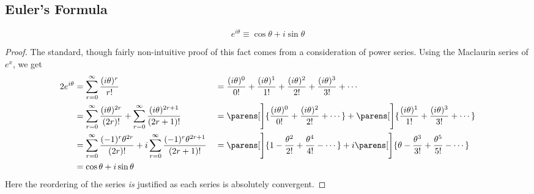 \subsection{Euler's Formula}

\begin{theorem}
 \begin{equation*}
  e^{i\theta} \equiv \cos \theta + i \sin \theta
 \end{equation*}
\end{theorem}
\begin{proof}
 The standard, though fairly non-intuitive proof of this fact comes from a
 consideration of power series. Using the Maclaurin series of \(e^x\), we get
 \begin{alignat*}2
  e^{i\theta} &= \sum_{r = 0}^\infty \frac{(i\theta)^r}{r!}
            &{}={}& \frac{(i\theta)^0}{0!} + \frac{(i\theta)^1}{1!}
               + \frac{(i\theta)^2}{2!} + \frac{(i\theta)^3}{3!} + \dotsb \\
              &= \sum_{r = 0}^\infty \frac{(i\theta)^{2r}}{(2r)!}
               + \sum_{r = 0}^\infty \frac{(i\theta)^{2r + 1}}{(2r + 1)!}
            &{}={}& \parens[\Bigg]{
                  \frac{(i\theta)^0}{0!} + \frac{(i\theta)^2}{2!} + \dotsb}
               + \parens[\Bigg]{
                  \frac{(i\theta)^1}{1!} + \frac{(i\theta)^3}{3!} + \dotsb} \\
              &= \sum_{r = 0}^\infty \frac{(-1)^r\theta^{2r}}{(2r)!}
               + i\sum_{r = 0}^\infty \frac{(-1)^r\theta^{2r + 1}}{(2r + 1)!}
            &{}={}& \parens[\Bigg]{
                  1 - \frac{\theta^2}{2!}
                + \frac{\theta^4}{4!} - \dotsb}
               + i\parens[\Bigg]{
                  \theta - \frac{\theta^3}{3!}
                + \frac{\theta^5}{5!} - \dotsb} \\
              &= \cos \theta + i \sin \theta
 \end{alignat*}
 Here the reordering of the series \emph{is} justified as each series is
 absolutely convergent. %
\end{proof}
